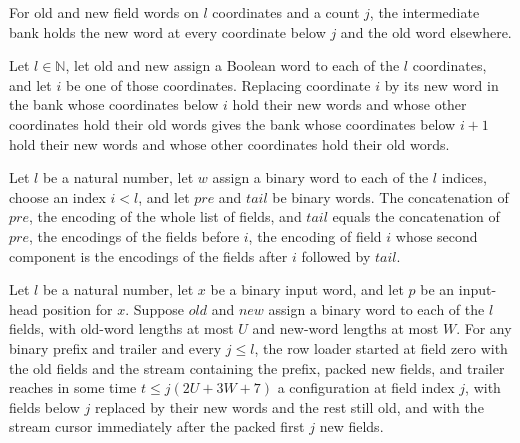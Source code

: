 \begin{definition}
\label{Complexity.clLoadWords}
\leanok
For old and new field words on $l$ coordinates and a count $j$, the intermediate bank holds the new word at every coordinate below $j$ and the old word elsewhere.
\end{definition}

\begin{lemma}
\label{Complexity.clLoadWords_step}
\leanok
{}
Let $l\in\mathbb{N}$, let $\mathrm{old}$ and $\mathrm{new}$ assign a Boolean word to
each of the $l$ coordinates, and let $i$ be one of those coordinates. Replacing
coordinate $i$ by its new word in the bank whose coordinates below $i$ hold their new
words and whose other coordinates hold their old words gives the bank whose coordinates
below $i+1$ hold their new words and whose other coordinates hold their old words.
\end{lemma}

\begin{lemma}
\label{Complexity.clLoad_split}
\leanok
{}
Let $l$ be a natural number, let $w$ assign a binary word to each of the $l$ indices,
choose an index $i<l$, and let $pre$ and $tail$ be binary words. The concatenation of
$pre$, the encoding of the whole list of fields, and $tail$ equals the concatenation of
$pre$, the encodings of the fields before $i$, the encoding of field $i$ whose second
component is the encodings of the fields after $i$ followed by $tail$.
\end{lemma}

\begin{lemma}
\label{Complexity.clLoad_prefix}
\leanok
{}
Let $l$ be a natural number, let $x$ be a binary input word, and let $p$ be an
input-head position for $x$. Suppose $old$ and $new$ assign a binary word to each of the
$l$ fields, with old-word lengths at most $U$ and new-word lengths at most $W$. For any
binary prefix and trailer and every $j\le l$, the row loader started at field zero with
the old fields and the stream containing the prefix, packed new fields, and trailer
reaches in some time $t\le j(2U+3W+7)$ a configuration at field index $j$, with fields
below $j$ replaced by their new words and the rest still old, and with the stream cursor
immediately after the packed first $j$ new fields.
\end{lemma}

